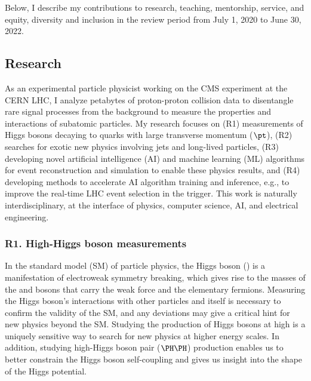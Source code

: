 \documentclass[11pt,letterpaper,notitlepage]{article}
\begin{document}
\pagestyle{fancyplain}

Below, I describe my contributions to research, teaching, mentorship, service, and equity, diversity and inclusion in the review period from July 1, 2020 to June 30, 2022.
\vspace{-1ex}
\subsection*{Research}

As an experimental particle physicist working on the CMS experiment at the CERN LHC, I analyze petabytes of proton-proton collision data to disentangle rare signal processes from the background to measure the properties and interactions of subatomic particles.
My research focuses on (R1) measurements of Higgs bosons decaying to quarks with large transverse momentum ($\pt$),
(R2) searches for exotic new physics involving jets and long-lived particles,
(R3) developing novel artificial intelligence (AI) and machine learning (ML) algorithms for event reconstruction and simulation to enable these physics results, and
(R4) developing methods to accelerate AI algorithm training and inference, e.g., to improve the real-time LHC event selection in the trigger.
This work is naturally interdisciplinary, at the interface of physics, computer science, AI, and electrical engineering.
\vspace{-1ex}
\subsubsection*{R1. High-\pt Higgs boson measurements}

In the standard model (SM) of particle physics, the Higgs boson (\PH) is a manifestation of electroweak symmetry breaking, which gives rise to the masses of the {\PW} and {\PZ} bosons that carry the weak force and the elementary fermions.
Measuring the Higgs boson's interactions with other particles and itself is necessary to confirm the validity of the SM, and any deviations may give a critical hint for new physics beyond the SM.
Studying the production of Higgs bosons at high \pt is a uniquely sensitive way to search for new physics at higher energy scales.
In addition, studying high-\pt Higgs boson pair ($\PH\PH$) production enables us to better constrain the Higgs boson self-coupling and gives us insight into the shape of the Higgs potential.
\end{document}
